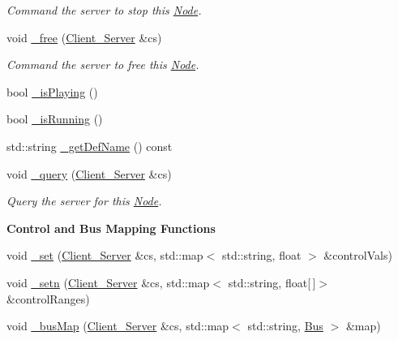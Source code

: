 \begin{DoxyCompactItemize}
\begin{DoxyCompactList}\small\item\em Command the server to stop this \hyperlink{classColliderPlusPlus_1_1Node}{Node}. \end{DoxyCompactList}\item 
\hypertarget{classColliderPlusPlus_1_1Node_aa0314218cf221dc32ae0f4e40a294f5c}{void \hyperlink{classColliderPlusPlus_1_1Node_aa0314218cf221dc32ae0f4e40a294f5c}{\-\_\-free} (\hyperlink{classColliderPlusPlus_1_1Client__Server}{Client\-\_\-\-Server} \&cs)}\label{classColliderPlusPlus_1_1Node_aa0314218cf221dc32ae0f4e40a294f5c}

\begin{DoxyCompactList}\small\item\em Command the server to free this \hyperlink{classColliderPlusPlus_1_1Node}{Node}. \end{DoxyCompactList}\item 
bool \hyperlink{classColliderPlusPlus_1_1Node_a52123c9868b5e1833750158c870c3b87}{\-\_\-is\-Playing} ()
\item 
bool \hyperlink{classColliderPlusPlus_1_1Node_a5f073a198b55b4c471e772ca2661d144}{\-\_\-is\-Running} ()
\item 
std\-::string \hyperlink{classColliderPlusPlus_1_1Node_a47ab8ce687a4336189a6cc629cdec56d}{\-\_\-get\-Def\-Name} () const 
\item 
\hypertarget{classColliderPlusPlus_1_1Node_ae7c26584a0d757d76ae6c3ce58e8fd9f}{void \hyperlink{classColliderPlusPlus_1_1Node_ae7c26584a0d757d76ae6c3ce58e8fd9f}{\-\_\-query} (\hyperlink{classColliderPlusPlus_1_1Client__Server}{Client\-\_\-\-Server} \&cs)}\label{classColliderPlusPlus_1_1Node_ae7c26584a0d757d76ae6c3ce58e8fd9f}

\begin{DoxyCompactList}\small\item\em Query the server for this \hyperlink{classColliderPlusPlus_1_1Node}{Node}. \end{DoxyCompactList}\end{DoxyCompactItemize}
\begin{Indent}{\bf Control and Bus Mapping Functions}\par
\begin{DoxyCompactItemize}
\item 
void \hyperlink{classColliderPlusPlus_1_1Node_a24201cfbe86e712cdd17313a54079d3a}{\-\_\-set} (\hyperlink{classColliderPlusPlus_1_1Client__Server}{Client\-\_\-\-Server} \&cs, std\-::map$<$ std\-::string, float $>$ \&control\-Vals)
\item 
void \hyperlink{classColliderPlusPlus_1_1Node_a9dd9bee73c31baa6e3584e81a06a2ad0}{\-\_\-setn} (\hyperlink{classColliderPlusPlus_1_1Client__Server}{Client\-\_\-\-Server} \&cs, std\-::map$<$ std\-::string, float\mbox{[}$\,$\mbox{]}$>$ \&control\-Ranges)
\item 
void \hyperlink{classColliderPlusPlus_1_1Node_a8b6f3b2a7274fe1a95cb309ed4dd60cb}{\-\_\-bus\-Map} (\hyperlink{classColliderPlusPlus_1_1Client__Server}{Client\-\_\-\-Server} \&cs, std\-::map$<$ std\-::string, \hyperlink{classColliderPlusPlus_1_1Bus}{Bus} $>$ \&map)
\end{DoxyCompactItemize}
\end{Indent}
